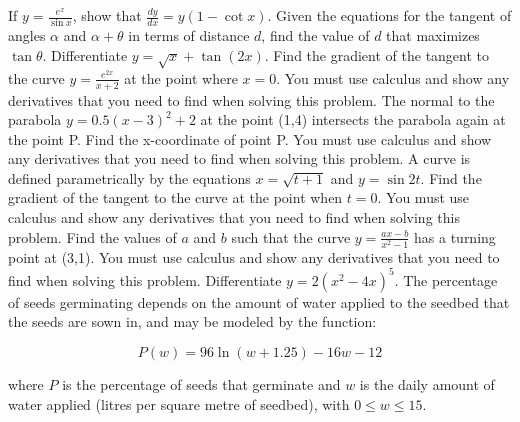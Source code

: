 \documentclass[12pt,addpoints]{exam}
\begin{document}
\begin{questions}
\fillwithlines{5cm}
\question[5] If \( y = \frac{e^x}{\sin x} \), show that \(\frac{dy}{dx} = y(1 - \cot x)\).
\fillwithlines{5cm}
\question[5] Given the equations for the tangent of angles \(\alpha\) and \(\alpha + \theta\) in terms of distance \(d\), find the value of \(d\) that maximizes \(\tan \theta\).
\fillwithlines{5cm}
\question[5] Differentiate \( y = \sqrt{x} + \tan(2x) \).
\fillwithlines{5cm}
\question[5] Find the gradient of the tangent to the curve \( y = \frac{e^{2x}}{x+2} \) at the point where \( x = 0 \). You must use calculus and show any derivatives that you need to find when solving this problem.
\fillwithlines{5cm}
\question[5] The normal to the parabola \( y = 0.5(x - 3)^2 + 2 \) at the point (1,4) intersects the parabola again at the point P. Find the x-coordinate of point P. You must use calculus and show any derivatives that you need to find when solving this problem.
\fillwithlines{5cm}
\question[5] A curve is defined parametrically by the equations \( x = \sqrt{t+1} \) and \( y = \sin 2t \). Find the gradient of the tangent to the curve at the point when \( t = 0 \). You must use calculus and show any derivatives that you need to find when solving this problem.
\fillwithlines{5cm}
\question[5] Find the values of \( a \) and \( b \) such that the curve \( y = \frac{ax - b}{x^2 - 1} \) has a turning point at (3,1). You must use calculus and show any derivatives that you need to find when solving this problem.
\fillwithlines{5cm}
\question[5] Differentiate \( y = 2(x^2 - 4x)^5 \).
\fillwithlines{5cm}
\question[5] The percentage of seeds germinating depends on the amount of water applied to the seedbed that the seeds are sown in, and may be modeled by the function:

\[ P(w) = 96 \ln(w + 1.25) - 16w - 12 \]

where \( P \) is the percentage of seeds that germinate and \( w \) is the daily amount of water applied (litres per square metre of seedbed), with \( 0 \leq w \leq 15 \).


\end{questions}
\end{document}
